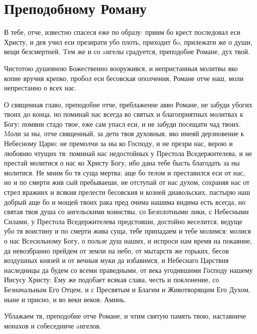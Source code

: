 \section{Преподобному Роману}\begin{mymulticols}



В тебе, отче, известно спасеся еже по образу: приим бо крест последовал еси Христу,  и дея учил еси презирати убо плоть, приходит бo, прилежати же о души, вещи безсмертней. Tем же и со aнгелы срадуется, преподобне Романе, дух твой.


Чистотою душевною Божественно вооружився, и непристанныя молитвы яко копие вручив крепко, пробол еси бесовская ополчения, Романе отче наш, моли непрестанно о всех нас.




О священная главо, преподобне отче, преблаженне авво Романе, не забуди убогих твоих до конца, но поминай нас всегда во святых и благоприятных молитвах к Богу: помяни стадо твое, еже сам упасл еси, и не забуди посещати чад твоих. Mоли за ны, отче священный, за дети твоя духовныя, яко имеяй дерзновение к Небесному Царю: не премолчи за ны ко Господу, и не презри нас, верою и любовию чтущих тя: поминай нас недостойных у Престола Вседержителева, и не престай молитися о нас ко Христу Богу, ибо дана тебе бысть благодать за ны молитися. Не мним бо тя суща мертва: аще бо телом и преставился еси от нас, но и по смерти жив сый пребываеши, не отступай от нас духом, сохраняя нас от стрел вражиих и всякия прелести бесовския и козней диавольских, пастырю наш добрый аще бо и мощей твоих рака пред очима нашима видима есть всегда, но святая твоя душа со ангельскими воинствы, со Безплотными лики, с Небесными Силами, у Престола Вседержителева предстояши, достойно веселится, ведуще убо тя воистину и по смерти жива суща, тебе припадаем и тебе молимся: молися о нас Всесильному Богу, о пользе душ наших, и испроси нам время на покаяние, да невозбранно прейдем от земли на небо, от мытарств же горьких, бесов воздушных князей и от вечныя муки да избавимся, и Небеснаго Царствия наследницы да будем со всеми праведными, от века угодившими Господу нашему Иисусу Христу: Ему же подобает всякая слава, честь и поклонение, со Безначальным Его Отцем, и с Пресвятым и Благим и Животворящим Его Духом, ныне и присно, и во веки веков. Аминь.




Ублажаем тя, преподобне отче Романе, и чтим святую память твою, наставниче монахов и собеседниче aнгелов.

\end{mymulticols}

